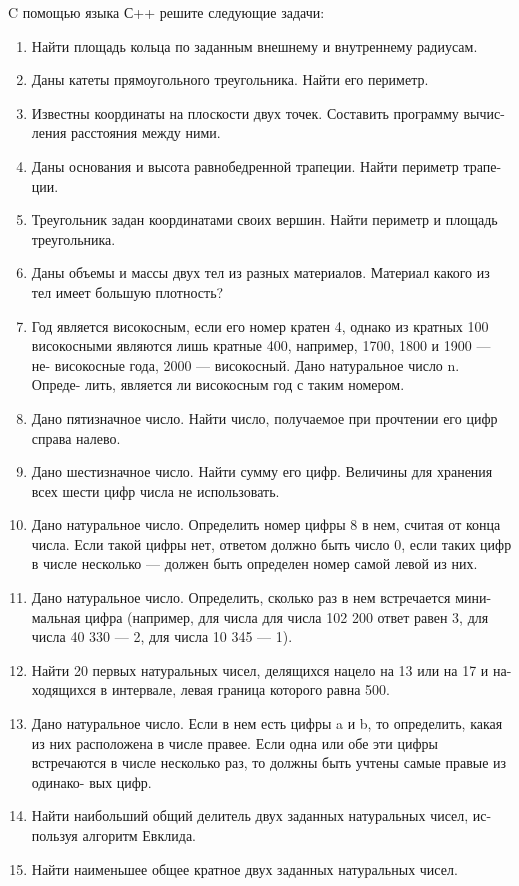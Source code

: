 \documentclass[a4paper,report,14pt]{ncc}
\begin{document}
C помощью языка С++ решите следующие задачи:
\begin{enumerate}
 \item Найти площадь кольца по заданным внешнему и внутреннему радиусам.
 \item Даны катеты прямоугольного треугольника. Найти его периметр.
 \item Известны координаты на плоскости двух точек. Составить программу вычис-
ления расстояния между ними.
\item Даны основания и высота равнобедренной трапеции. Найти периметр трапе-
ции.
\item Треугольник задан координатами своих вершин. Найти периметр и площадь
треугольника.
\item Даны объемы и массы двух тел из разных материалов. Материал какого из тел
имеет большую плотность?
\item Год является високосным, если его номер кратен 4, однако из кратных 100
високосными являются лишь кратные 400, например, 1700, 1800 и 1900 — не-
високосные года, 2000 — високосный. Дано натуральное число n. Опреде-
лить, является ли високосным год с таким номером.
\item Дано пятизначное число. Найти число, получаемое при прочтении его цифр
справа налево.
\item Дано шестизначное число. Найти сумму его цифр. Величины для хранения
всех шести цифр числа не использовать.
\item Дано натуральное число. Определить номер цифры 8 в нем, считая от конца
числа. Если такой цифры нет, ответом должно быть число 0, если таких цифр
в числе несколько — должен быть определен номер самой левой из них.
\item Дано натуральное число. Определить, сколько раз в нем встречается мини-
мальная цифра (например, для числа для числа 102 200 ответ равен 3, для
числа 40 330 — 2, для числа 10 345 — 1).
\item Найти 20 первых натуральных чисел, делящихся нацело на 13 или на 17 и на-
ходящихся в интервале, левая граница которого равна 500.
\item Дано натуральное число. Если в нем есть цифры a и b, то определить, какая из
них расположена в числе правее. Если одна или обе эти цифры встречаются
в числе несколько раз, то должны быть учтены самые правые из одинако-
вых цифр.
\item Найти наибольший общий делитель двух заданных натуральных чисел, ис-
пользуя алгоритм Евклида.
\item Найти наименьшее общее кратное двух заданных натуральных чисел.
\end{enumerate}
\end{document}
